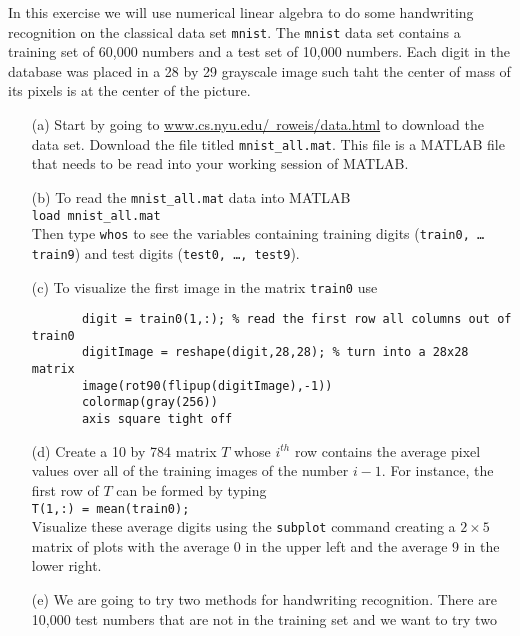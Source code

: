 \begin{problem}
    In this exercise we will use numerical linear algebra to do some handwriting
    recognition on the classical data set \texttt{mnist}.  The \texttt{mnist} data set
    contains a training set of 60,000 numbers and a test set of 10,000 numbers.  Each
    digit in the database was placed in a 28 by 29 grayscale image such taht the center of
    mass of its pixels is at the center of the picture.  
    \begin{enumerate}
        \item[(a)] Start by going to
            \href{http://www.cs.nyu.edu/~roweis/data.html}{www.cs.nyu.edu/~roweis/data.html}
            to download the data set.  Download the file titled \verb|mnist_all.mat|.
            This file is a MATLAB file that needs to be read into your working session of
            MATLAB.  
        \item[(b)] To read the \verb|mnist_all.mat| data into MATLAB \\
            \verb|load mnist_all.mat|\\
            Then type \verb|whos| to see the variables containing training digits
            (\texttt{train0, \ldots train9}) and test digits (\texttt{test0, \ldots,
            test9}).
        \item[(c)] To visualize the first image in the matrix \texttt{train0} use 
       \begin{verbatim}
       digit = train0(1,:); % read the first row all columns out of train0
       digitImage = reshape(digit,28,28); % turn into a 28x28 matrix
       image(rot90(flipup(digitImage),-1))
       colormap(gray(256))
       axis square tight off
       \end{verbatim}
        \item[(d)] Create a 10 by 784 matrix $T$ whose $i^{th}$ row contains the average
            pixel values over all of the training images of the number $i-1$.  For
            instance, the first row of $T$ can be formed by typing \\
            \verb|T(1,:) = mean(train0);| \\
            Visualize these average digits using the \texttt{subplot} command creating a
            $2 \times 5$ matrix of plots with the average 0 in the upper left and the
            average 9 in the lower right.
        \item[(e)] We are going to try two methods for handwriting recognition.  There are
            10,000 test numbers that are not in the training set and we want to try two

\end{enumerate}
\end{problem}
